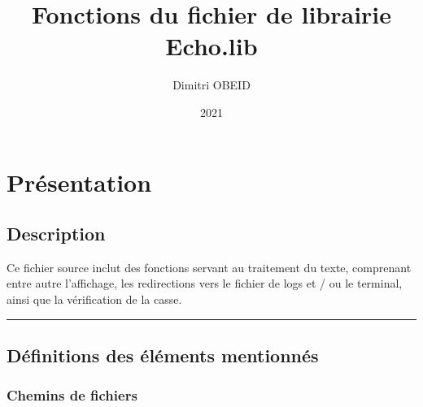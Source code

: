 \documentclass[a4paper,10pt]{article}
\title{\color{sec1}Fonctions du fichier de librairie \color{path}Echo.lib}\color{text}
\author{Dimitri OBEID}
\date{2021}
\begin{document}
\maketitle
\newpage

\hypertarget{contents}{}
\tableofcontents
\newpage

\color{sec1}
\section{Présentation}\color{text}

\color{sec2}
\subsection{Description}\color{text}

\begin{justify}
    Ce fichier source inclut des fonctions servant au traitement du texte, comprenant entre autre l'affichage, les redirections vers le fichier de logs et / ou le terminal, ainsi que la vérification de la casse.
\end{justify}




\color{sec2}\par\noindent\rule{\textwidth}{0.4pt}\color{text}

\color{sec2}
\subsection{Définitions des éléments mentionnés}\color{text}

\color{sec3}
\subsubsection{Chemins de fichiers}\color{text}
\end{document}

